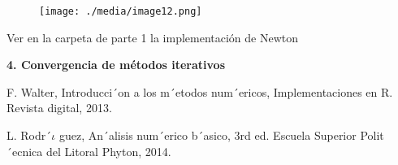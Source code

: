 \documentclass[12pt]{article}
\renewcommand{\_}{\kern-1.5pt\textunderscore\kern-1.5pt}
\begin{document}

\begin{figure}[H]
	\begin{Center}
		\texttt{[image: ./media/image12.png]}
	\end{Center}
\end{figure}



\par


\vspace{\baselineskip}
\setlength{\parskip}{8.04pt}
\setlength{\parskip}{0.0pt}
\begin{adjustwidth}{0.5in}{0.0in}
\begin{justify}
{\fontsize{10pt}{12.0pt}\selectfont Ver en la carpeta de parte 1 la implementación de Newton\par}
\end{justify}\par

\end{adjustwidth}


\vspace{\baselineskip}
\setlength{\parskip}{8.04pt}

\vspace{\baselineskip}
\setlength{\parskip}{0.0pt}
\setlength{\parskip}{8.04pt}
\setlength{\parskip}{0.0pt}
\begin{justify}
\textbf{4. Convergencia de métodos iterativos}
\end{justify}\par

\begin{justify}
{\fontsize{10pt}{12.0pt}\selectfont  [1]F. Walter, Introducci´on a los m´etodos num´ericos, Implementaciones en R. Revista digital, 2013.\par}
\end{justify}\par

\begin{justify}
{\fontsize{10pt}{12.0pt}\selectfont [2]L. Rodr´$\iota$ guez, An´alisis num´erico b´asico, 3rd ed. Escuela Superior Polit´ecnica del Litoral Phyton, 2014.\par}
\end{justify}\par


\printbibliography
\end{document}
